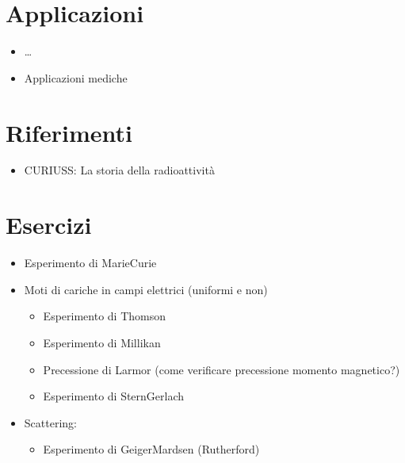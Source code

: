 \documentclass[letterpaper,10pt,italian]{jupyterBook}
\begin{document}
\section{Applicazioni}
\label{\detokenize{ch/modern/intro-radioactivity:applicazioni}}\begin{itemize}
\item {} 
\sphinxAtStartPar
…

\item {} 
\sphinxAtStartPar
Applicazioni mediche

\end{itemize}


\section{Riferimenti}
\label{\detokenize{ch/modern/intro-radioactivity:riferimenti}}\begin{itemize}
\item {} 
\sphinxAtStartPar
CURIUSS: La storia della radioattività

\end{itemize}


\section{Esercizi}
\label{\detokenize{ch/modern/intro-radioactivity:esercizi}}\begin{itemize}
\item {} 
\sphinxAtStartPar
Esperimento di Marie\sphinxhyphen{}Curie

\item {} 
\sphinxAtStartPar
Moti di cariche in campi elettrici (uniformi e non)
\begin{itemize}
\item {} 
\sphinxAtStartPar
Esperimento di Thomson

\item {} 
\sphinxAtStartPar
Esperimento di Millikan

\item {} 
\sphinxAtStartPar
Precessione di Larmor (come verificare precessione momento magnetico?)

\item {} 
\sphinxAtStartPar
Esperimento di Stern\sphinxhyphen{}Gerlach

\end{itemize}

\item {} 
\sphinxAtStartPar
Scattering:
\begin{itemize}
\item {} 
\sphinxAtStartPar
Esperimento di Geiger\sphinxhyphen{}Mardsen (Rutherford)

\end{itemize}

\end{itemize}
\end{document}
